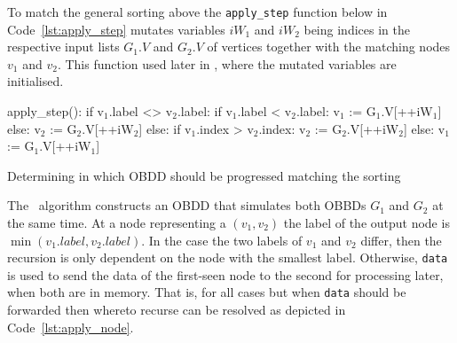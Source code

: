 To match the general sorting above the \lstinline{apply_step} function below in
Code~\ref{lst:apply_step} mutates variables $\mathit{iW}_1$ and $\mathit{iW}_2$
being indices in the respective input lists $G_1.V$ and $G_2.V$ of vertices
together with the matching nodes $v_1$ and $v_2$. This function used later in
\Apply, where the mutated variables are initialised.
\begin{lstfloat}
  \centering

  \begin{blstlisting}
  apply_step():
      if v$_1$.label <> v$_2$.label:
          if v$_1$.label < v$_2$.label:
              v$_1$ := G$_1$.V[++iW$_1$]
          else:
              v$_2$ := G$_2$.V[++iW$_2$]
      else:
          if v$_1$.index > v$_2$.index:
              v$_2$ := G$_2$.V[++iW$_2$]
          else:
              v$_1$ := G$_1$.V[++iW$_1$]
  \end{blstlisting}

  \caption{Determining in which OBDD should be progressed matching the sorting}
  \label{lst:apply_step}
\end{lstfloat}

The \Apply\ algorithm constructs an OBDD that simulates both OBBDs $G_1$ and
$G_2$ at the same time. At a node representing a $(v_1,v_2)$ the label of the
output node is $\min(v_1.\mathit{label},v_2.\mathit{label})$. In the case the
two labels of $v_1$ and $v_2$ differ, then the recursion is only dependent on
the node with the smallest label. Otherwise, \lstinline{data} is used to send
the data of the first-seen node to the second for processing later, when both
are in memory. That is, for all cases but when \lstinline{data} should be
forwarded then whereto recurse can be resolved as depicted in
Code~\ref{lst:apply_node}.

